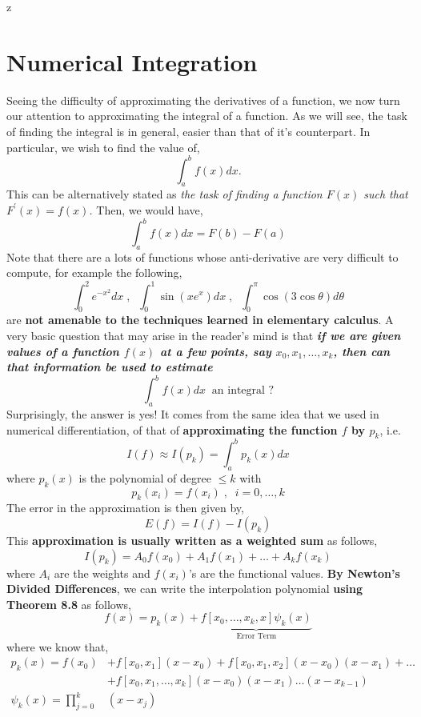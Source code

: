 z\documentclass[a4paper,12pt,twoside]{book}
\newcommand{\nll}[0]{\newline\newline}
\newcommand{\tit}[1]{\textit{#1}}
\begin{document}
\chapter{Numerical Integration}
Seeing the difficulty of approximating the derivatives of a function, we now turn our attention to approximating the integral of a function. As we will see, the task of finding the integral is in general, easier than that of it's counterpart.
\nll
In particular, we wish to find the value of,
\[ \int_a^bf(x)dx.\]
This can be alternatively stated as \tit{the task of finding a function $F(x)$ such that $F^\prime(x) = f(x)$.} Then, we would have,
\[\int_a^bf(x)dx = F(b) - F(a)\]
Note that there are a lots of functions whose anti-derivative are very difficult to compute, for example the following,
\[\int_0^2e^{-x^2}dx \;,\;\;\int_0^1\sin(xe^x)dx\;,\;\;\int_0^\pi\cos(3\cos\theta) d\theta\]
are \textbf{not amenable to the techniques learned in elementary calculus}.
\nll
A very basic question that may arise in the reader's mind is that \textbf{\tit{if we are given values of a function $f(x)$ at a few points, say $x_0,x_1,\dots,x_k$, then can that information be used to estimate
\[\int_a^bf(x)dx \;\;\text{an integral ?}\]
}}
Surprisingly, the answer is yes! It comes from the same idea that we used in numerical differentiation, of that of \textbf{approximating the function $f$ by $p_k$}, i.e.
\begin{equation}
    I(f) \approx I(p_k) = \int_a^b p_k(x)dx
\end{equation}
where $p_k(x)$ is the polynomial of degree $\le k$ with
\begin{equation}
     p_k(x_i) = f(x_i)\;,\;\; i=0,\dots,k
\end{equation}
The error in the approximation is then given by,
\[E(f) = I(f) - I(p_k)\]
This \textbf{approximation is usually written as a weighted sum} as follows,
\begin{equation}
    I(p_k) = A_0f(x_0) + A_1f(x_1) + \dots + A_kf(x_k)
\end{equation}
where $A_i$ are the weights and $f(x_i)$'s are the functional values.
\nll
\textbf{By Newton's Divided Differences}, we can write the interpolation polynomial \textbf{using Theorem 8.8} as follows,
\[ f(x) = p_k(x) + \underbrace{f[x_0,\dots,x_k,x]\psi_k(x)}_{\text{Error Term}} \]
where we know that,
\begin{equation*}
    \begin{split}
        p_k(x) = f(x_0) &+ f[x_0,x_1](x-x_0) + f[x_0,x_1,x_2](x-x_0)(x-x_1)+ \dots\\
        &+ f[x_0,x_1,\dots,x_k](x-x_0)(x-x_1)\dots(x-x_{k-1})\\
        \psi_k(x) = \prod_{j=0}^k&(x-x_j)
    \end{split}
\end{equation*}
\end{document}
